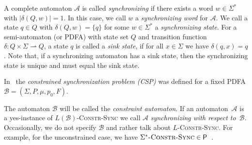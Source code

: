 A complete automaton $\mathcal A$ is called \emph{synchronizing} if there exists a word $w \in \Sigma^*$ with $|\delta(Q, w)| = 1$. In this case, we call $w$ a \emph{synchronizing word} for $\mathcal A$.
We call a state $q\in Q$ with $\delta(Q, w)=\{q\}$ for some $w\in \Sigma^*$ a \emph{synchronizing state}.
For a semi-automaton (or PDFA) with state set $Q$ and transition function $\delta : Q \times \Sigma \rightharpoonup Q$,
a state $q$ is called a \emph{sink state}, if for all $x \in \Sigma$ we have $\delta(q,x) = q$.
Note that, if a synchronizing automaton has a sink state, then the
synchronizing state is unique and must equal the sink state.



In~\cite{DBLP:conf/mfcs/FernauGHHVW19} the \emph{constrained synchronization problem (CSP)} 
was defined for a fixed PDFA
$\mathcal B = (\Sigma, P, \mu, p_0, F)$. %

\begin{decproblem}\label{def:problem_L-constr_Sync}
\end{decproblem}

The automaton $\mathcal B$ will be called the \emph{constraint automaton}.
If an automaton~$\mathcal A$ is a yes-instance of \textsc{$L(\mathcal B)$-Constr-Sync} we call $\mathcal A$ \emph{synchronizing with respect to~$\mathcal{B}$}. %
Occasionally,
we do not specify $\mathcal{B}$ and rather talk about \textsc{$L$-Constr-Sync}.
For example, for the unconstrained case, 
we have $\Sigma^*\textsc{-Constr-Sync}\in \textsf{P}$~\cite{Cer64,Vol2008}.



